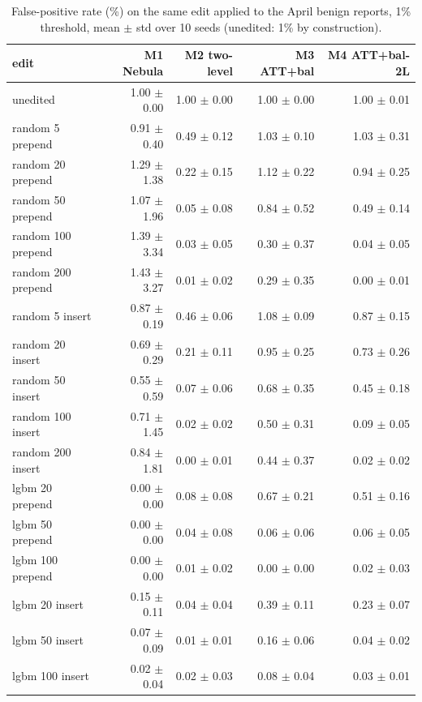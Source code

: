 \begin{table}[t]
\centering
\small
\caption{False-positive rate (\%) on the same edit applied to the April benign reports, 1\% threshold, mean $\pm$ std over 10 seeds (unedited: 1\% by construction).}
\label{tab:T5c_attack_padded_benign_fpr_1pct}
\begin{tabular}{lrrrr}
\toprule
edit & M1 Nebula & M2 two-level & M3 ATT+bal & M4 ATT+bal-2L \\
\midrule
unedited & 1.00 $\pm$ 0.00 & 1.00 $\pm$ 0.00 & 1.00 $\pm$ 0.00 & 1.00 $\pm$ 0.01 \\
random 5 prepend & 0.91 $\pm$ 0.40 & 0.49 $\pm$ 0.12 & 1.03 $\pm$ 0.10 & 1.03 $\pm$ 0.31 \\
random 20 prepend & 1.29 $\pm$ 1.38 & 0.22 $\pm$ 0.15 & 1.12 $\pm$ 0.22 & 0.94 $\pm$ 0.25 \\
random 50 prepend & 1.07 $\pm$ 1.96 & 0.05 $\pm$ 0.08 & 0.84 $\pm$ 0.52 & 0.49 $\pm$ 0.14 \\
random 100 prepend & 1.39 $\pm$ 3.34 & 0.03 $\pm$ 0.05 & 0.30 $\pm$ 0.37 & 0.04 $\pm$ 0.05 \\
random 200 prepend & 1.43 $\pm$ 3.27 & 0.01 $\pm$ 0.02 & 0.29 $\pm$ 0.35 & 0.00 $\pm$ 0.01 \\
random 5 insert & 0.87 $\pm$ 0.19 & 0.46 $\pm$ 0.06 & 1.08 $\pm$ 0.09 & 0.87 $\pm$ 0.15 \\
random 20 insert & 0.69 $\pm$ 0.29 & 0.21 $\pm$ 0.11 & 0.95 $\pm$ 0.25 & 0.73 $\pm$ 0.26 \\
random 50 insert & 0.55 $\pm$ 0.59 & 0.07 $\pm$ 0.06 & 0.68 $\pm$ 0.35 & 0.45 $\pm$ 0.18 \\
random 100 insert & 0.71 $\pm$ 1.45 & 0.02 $\pm$ 0.02 & 0.50 $\pm$ 0.31 & 0.09 $\pm$ 0.05 \\
random 200 insert & 0.84 $\pm$ 1.81 & 0.00 $\pm$ 0.01 & 0.44 $\pm$ 0.37 & 0.02 $\pm$ 0.02 \\
lgbm 20 prepend & 0.00 $\pm$ 0.00 & 0.08 $\pm$ 0.08 & 0.67 $\pm$ 0.21 & 0.51 $\pm$ 0.16 \\
lgbm 50 prepend & 0.00 $\pm$ 0.00 & 0.04 $\pm$ 0.08 & 0.06 $\pm$ 0.06 & 0.06 $\pm$ 0.05 \\
lgbm 100 prepend & 0.00 $\pm$ 0.00 & 0.01 $\pm$ 0.02 & 0.00 $\pm$ 0.00 & 0.02 $\pm$ 0.03 \\
lgbm 20 insert & 0.15 $\pm$ 0.11 & 0.04 $\pm$ 0.04 & 0.39 $\pm$ 0.11 & 0.23 $\pm$ 0.07 \\
lgbm 50 insert & 0.07 $\pm$ 0.09 & 0.01 $\pm$ 0.01 & 0.16 $\pm$ 0.06 & 0.04 $\pm$ 0.02 \\
lgbm 100 insert & 0.02 $\pm$ 0.04 & 0.02 $\pm$ 0.03 & 0.08 $\pm$ 0.04 & 0.03 $\pm$ 0.01 \\
\bottomrule
\end{tabular}
\end{table}
